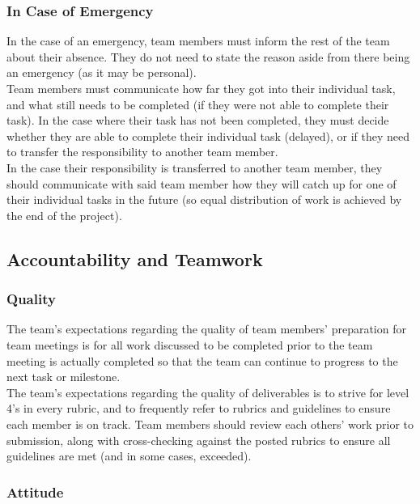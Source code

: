 \documentclass{article}
\begin{document}
\subsubsection*{In Case of Emergency}

In the case of an emergency, team members must inform the rest of the team about their absence.
They do not need to state the reason aside from there being an emergency (as it may be personal).\\
\indent Team members must communicate how far they got into their individual task, and what still needs to be completed
(if they were not able to complete their task). In the case where their task has not been completed, they must
decide whether they are able to complete their individual task (delayed), or if they need to transfer
the responsibility to another team member.\\
\indent In the case their responsibility is transferred to another team member, they should communicate with said
team member how they will catch up for one of their individual tasks in the future (so equal distribution
of work is achieved by the end of the project).

\subsection*{Accountability and Teamwork}

\subsubsection*{Quality} 

The team's expectations regarding the quality of team members' preparation for team meetings
is for all work discussed to be completed prior to the team meeting is actually completed so
that the team can continue to progress to the next task or milestone.\\
\indent The team's expectations regarding the quality of deliverables is to strive for level
4's in every rubric, and to frequently refer to rubrics and guidelines to ensure each member
is on track. Team members should review each others' work prior to submission, along with
cross-checking against the posted rubrics to ensure all guidelines are met
(and in some cases, exceeded).


\subsubsection*{Attitude}
\end{document}
